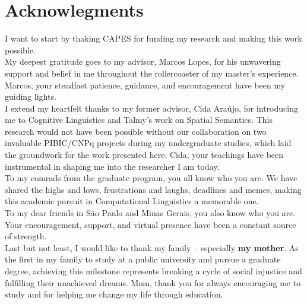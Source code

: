 \chapter*{Acknowlegments}


\vfill

I want to start by thaking CAPES for funding my research and making this work possible. \\

My deepest gratitude goes to my advisor, Marcos Lopes, for his unwavering support and belief in me throughout the rollercoaster of my master's experience. Marcos, your steadfast patience, guidance, and encouragement have been my guiding lights. \\

I extend my heartfelt thanks to my former advisor, Cida Araújo, for introducing me to Cognitive Linguistics and Talmy's work on Spatial Semantics. This research would not have been possible without our collaboration on two invaluable PIBIC/CNPq projects during my undergraduate studies, which laid the groundwork for the work presented here. Cida, your teachings have been instrumental in shaping me into the researcher I am today. \\

To my comrads from the graduate program, you all know who you are. We have shared the highs and lows, frustrations and laughs, deadlines and memes, making this academic pursuit in Computational Linguistics a memorable one. \\

To my dear friends in São Paulo and Minas Gerais, you also know who you are. Your encouragement, support, and virtual presence have been a constant source of strength. \\

Last but not least, I would like to thank my family -- especially \textbf{my mother}. As the first in my family to study at a public university and pursue a graduate degree, achieving this milestone represents breaking a cycle of social injustice and fulfilling their unachieved dreams. Mom, thank you for always encouraging me to study and for helping me change my life through education.

\vfill